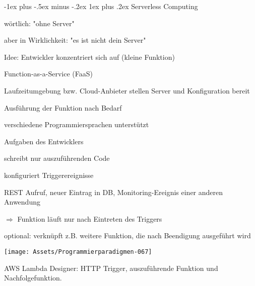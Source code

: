 \documentclass[10pt]{article}
\makeatletter
\renewcommand{\subsubsection}{\@startsection{subsubsection}{3}{0mm}%
                                {-1ex plus -.5ex minus -.2ex}%
                                {1ex plus .2ex}%
                                {\normalfont\small\bfseries}}
\makeatother
\begin{document}
\subsubsection{Serverless Computing}
\begin{itemize*}
  \item wörtlich: "ohne Server"
  \begin{itemize*}
    \item aber in Wirklichkeit: "es ist nicht dein Server"
    \item Idee: Entwickler konzentriert sich auf (kleine Funktion)
    \begin{itemize*}
      \item Function-as-a-Service (FaaS)
    \end{itemize*}
    \item Laufzeitumgebung bzw. Cloud-Anbieter stellen Server und Konfiguration bereit
    \item Ausführung der Funktion nach Bedarf
    \item verschiedene Programmiersprachen unterstützt
  \end{itemize*}
\end{itemize*}
Aufgaben des Entwicklers
\begin{itemize*}
  \item schreibt nur auszuführenden Code
  \item konfiguriert Triggerereignisse
  \begin{itemize*}
    \item REST Aufruf, neuer Eintrag in DB, Monitoring-Ereignis einer anderen Anwendung
    \item $\Rightarrow$ Funktion läuft nur nach Eintreten des Triggers
    \item optional: verknüpft z.B. weitere Funktion, die nach Beendigung ausgeführt wird
  \end{itemize*}
\end{itemize*}
\begin{center}
  \centering
  \texttt{[image: Assets/Programmierparadigmen-067]}
\end{center}
AWS Lambda Designer: HTTP Trigger, auszuführende Funktion und Nachfolgefunktion.
\end{document}
